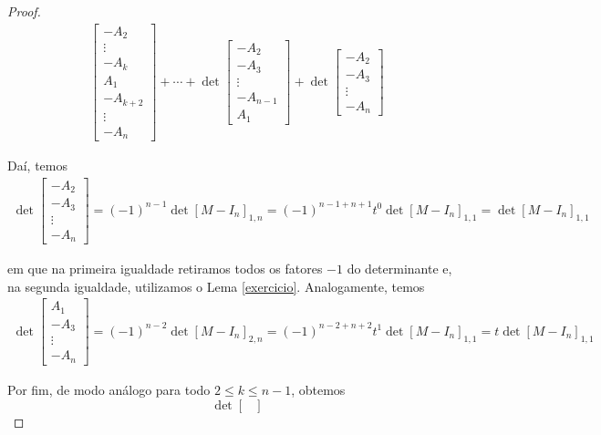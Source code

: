 \begin{proof}
\begin{align*}
\begin{bmatrix}
		-A_2 \\
		\vdots\\
		-A_k \\
		A_1\\
		-A_{k+2}\\
		\vdots\\
		-A_n
		\end{bmatrix} +\cdots + 
		\det\begin{bmatrix}
		-A_2\\
		-A_3 \\
		\vdots\\
		-A_{n-1}\\
		A_1
		\end{bmatrix}+\det\begin{bmatrix}
		-A_2\\
		-A_3\\
		\vdots\\
		-A_n
		\end{bmatrix}
		\end{align*}
		\par\vspace{0.3cm} Daí, temos
		\begin{align*}
		\det\begin{bmatrix}
		-A_2\\
		-A_3\\
		\vdots \\
		-A_n
		\end{bmatrix} = (-1)^{n-1}\det[M-I_n]_{1,n} = (-1)^{n-1+n+1}t^0\det[M - I_n]_{1,1} = \det[M-I_n]_{1,1}
		\end{align*}
		\par\vspace{0.3cm} em que na primeira igualdade retiramos todos os fatores $-1$ do determinante e, na segunda igualdade, utilizamos o Lema \eqref{exercicio}. Analogamente, temos
		\begin{align*}
		\det\begin{bmatrix}
		A_1\\
		-A_3\\
		\vdots\\
		-A_n
		\end{bmatrix} = (-1)^{n-2}\det[M-I_n]_{2,n} = (-1)^{n-2+n+2}t^1\det[M - I_n]_{1,1} = t\det[M - I_n]_{1,1}
		\end{align*}
		\par\vspace{0.3cm} Por fim, de modo análogo para todo $2\leq k\leq n-1$, obtemos
		\begin{equation*}
		\det\begin{bmatrix}

\end{bmatrix}
\end{equation*}
\end{proof}
